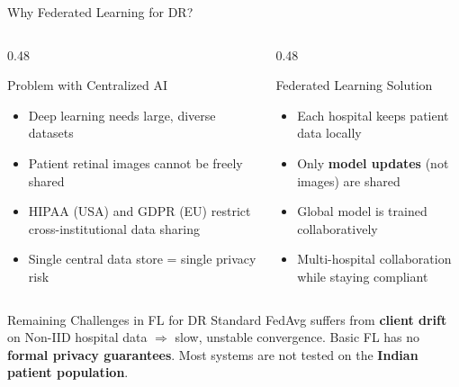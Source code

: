 \documentclass[aspectratio=169, 11pt]{beamer}
\begin{document}
\begin{frame}{Why Federated Learning for DR?}
  \begin{columns}[T]
    \begin{column}{0.48\textwidth}
      \begin{alertblock}{Problem with Centralized AI}
        \small\begin{itemize}
          \item Deep learning needs large, diverse datasets
          \item Patient retinal images cannot be freely shared
          \item HIPAA (USA) and GDPR (EU) restrict cross-institutional data sharing
          \item Single central data store = single privacy risk
        \end{itemize}
      \end{alertblock}
    \end{column}
    \begin{column}{0.48\textwidth}
      \begin{exampleblock}{Federated Learning Solution}
        \small\begin{itemize}
          \item Each hospital keeps patient data locally
          \item Only \textbf{model updates} (not images) are shared
          \item Global model is trained collaboratively
          \item Multi-hospital collaboration while staying compliant
        \end{itemize}
      \end{exampleblock}
    \end{column}
  \end{columns}
  \vspace{6pt}
  \begin{block}{Remaining Challenges in FL for DR}\small
    Standard FedAvg suffers from \textbf{client drift} on Non-IID hospital data $\Rightarrow$ slow, unstable convergence. Basic FL has no \textbf{formal privacy guarantees}. Most systems are not tested on the \textbf{Indian patient population}.
  \end{block}
\end{frame}
\end{document}
